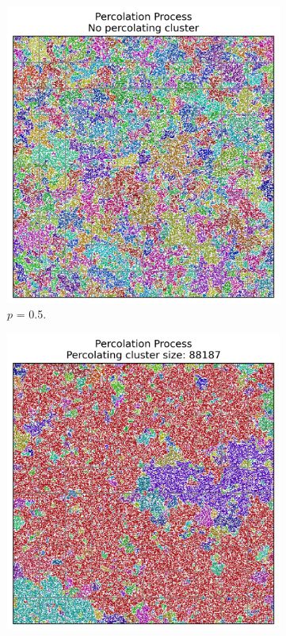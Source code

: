 \documentclass[12pt,a4paper]{article}
\begin{document}
\begin{figure}[H]
    \centering
    \begin{subfigure}[h]{0.45\textwidth}
        \centering
        \includegraphics[width=1.0\linewidth]{../figures/clusterpercolation3.png}
        \caption{$p$ = 0.5.}
        \label{fig:3a}
    \end{subfigure}
    \hspace{0.02 cm}
    \begin{subfigure}[h]{0.45\textwidth}
        \centering
        \includegraphics[width=1.0\linewidth]{../figures/clusterpercolation4.png}

\end{subfigure}
\end{figure}
\end{document}
